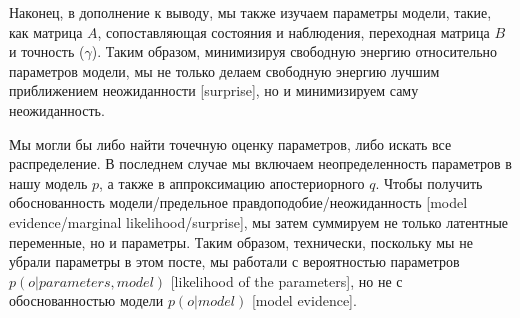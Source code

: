 \documentclass[twoside,leqno, 11pt]{article}
\begin{document}
	\begin{figure}[h]
	\end{figure}
	
	Наконец, в дополнение к выводу, мы также изучаем параметры модели, такие, как матрица $A$, сопоставляющая состояния и наблюдения, переходная матрица $B$ и точность ($\gamma$). Таким образом, минимизируя свободную энергию относительно параметров модели, мы не только делаем свободную энергию лучшим приближением неожиданности [surprise], но и минимизируем саму неожиданность.
	
	\begin{figure}[h]
	\end{figure}
	
	
	Мы могли бы либо найти точечную оценку параметров, либо искать все распределение. В последнем случае мы включаем неопределенность параметров в нашу модель $p$, а также в аппроксимацию апостериорного $q$. Чтобы получить обоснованность модели/предельное правдоподобие/неожиданность [model evidence/marginal likelihood/surprise], мы затем суммируем не только латентные переменные, но и параметры. Таким образом, технически, поскольку мы не убрали параметры в этом посте, мы работали с вероятностью параметров $p(o|parameters, model)$ [likelihood of the parameters], но не с обоснованностью модели $p(o|model)$ [model evidence].
	
\end{document}
